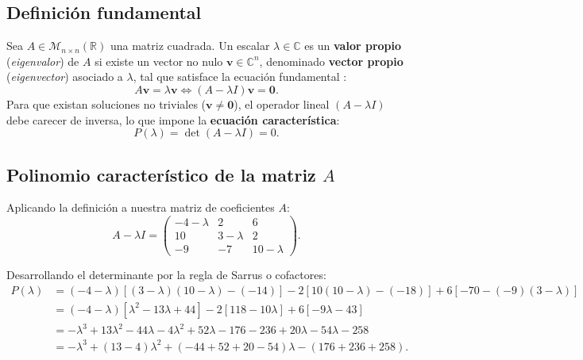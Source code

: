 \documentclass[spanish,letterpaper,oneside]{article}
\begin{document}
\subsection{Definición fundamental}
Sea $A \in \mathcal{M}_{n \times n}(\mathbb{R})$ una matriz cuadrada. Un escalar $\lambda \in \mathbb{C}$ es un \textbf{valor propio} (\emph{eigenvalor}) de $A$ si existe un vector no nulo $\mathbf{v} \in \mathbb{C}^n$, denominado \textbf{vector propio} (\emph{eigenvector}) asociado a $\lambda$, tal que satisface la ecuación fundamental \citep{grossman2019,lay2016}:
\begin{equation}
A\mathbf{v} = \lambda \mathbf{v} \iff (A - \lambda I)\mathbf{v} = \mathbf{0}.
\end{equation}
Para que existan soluciones no triviales ($\mathbf{v} \neq \mathbf{0}$), el operador lineal $(A - \lambda I)$ debe carecer de inversa, lo que impone la \textbf{ecuación característica}:
\begin{equation}
P(\lambda) = \det(A - \lambda I) = 0.
\end{equation}

\subsection{Polinomio característico de la matriz $A$}
Aplicando la definición a nuestra matriz de coeficientes $A$:
\begin{equation}
A - \lambda I = \begin{pmatrix}
-4-\lambda & 2 & 6 \\
10 & 3-\lambda & 2 \\
-9 & -7 & 10-\lambda
\end{pmatrix}.
\end{equation}

Desarrollando el determinante por la regla de Sarrus o cofactores:
\begin{align*}
P(\lambda) &= (-4-\lambda)\left[(3-\lambda)(10-\lambda) - (-14)\right] - 2\left[10(10-\lambda) - (-18)\right] + 6\left[-70 - (-9)(3-\lambda)\right] \\
&= (-4-\lambda)\left[\lambda^2 - 13\lambda + 44\right] - 2\left[118 - 10\lambda\right] + 6\left[-9\lambda - 43\right] \\
&= -\lambda^3 + 13\lambda^2 - 44\lambda - 4\lambda^2 + 52\lambda - 176 - 236 + 20\lambda - 54\lambda - 258 \\
&= -\lambda^3 + (13-4)\lambda^2 + (-44+52+20-54)\lambda - (176+236+258).
\end{align*}
\end{document}
